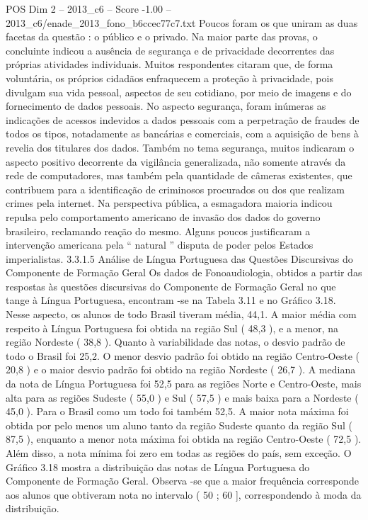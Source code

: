 \begin{textsample}{POS Dim 2 – 2013\_c6 – Score -1.00 – 2013\_c6/enade\_2013\_fono\_b6ccec77c7.txt}
Poucos foram os que uniram as duas facetas da questão : o público e o privado.
Na maior parte das provas, o concluinte indicou a ausência de segurança e de privacidade decorrentes das próprias atividades individuais.
Muitos respondentes citaram que, de forma voluntária, os próprios cidadãos enfraquecem a proteção à privacidade, pois divulgam sua vida pessoal, aspectos de seu cotidiano, por meio de imagens e do fornecimento de dados pessoais.
No aspecto segurança, foram inúmeras as indicações de acessos indevidos a dados pessoais com a perpetração de fraudes de todos os tipos, notadamente as bancárias e comerciais, com a aquisição de bens à revelia dos titulares dos dados.
Também no tema segurança, muitos indicaram o aspecto positivo decorrente da vigilância generalizada, não somente através da rede de computadores, mas também pela quantidade de câmeras existentes, que contribuem para a identificação de criminosos procurados ou dos que realizam crimes pela internet.
Na perspectiva pública, a esmagadora maioria indicou repulsa pelo comportamento americano de invasão dos dados do governo brasileiro, reclamando reação do mesmo.
Alguns poucos justificaram a intervenção americana pela “ natural ” disputa de poder pelos Estados imperialistas. 3.3.1.5 Análise de Língua Portuguesa das Questões Discursivas do Componente de Formação Geral Os dados de Fonoaudiologia, obtidos a partir das respostas às questões discursivas do Componente de Formação Geral no que tange à Língua Portuguesa, encontram -se na Tabela 3.11 e no Gráfico 3.18.
Nesse aspecto, os alunos de todo Brasil tiveram média, 44,1.
A maior média com respeito à Língua Portuguesa foi obtida na região Sul ( 48,3 ), e a menor, na região Nordeste ( 38,8 ).
Quanto à variabilidade das notas, o desvio padrão de todo o Brasil foi 25,2.
O menor desvio padrão foi obtido na região Centro-Oeste ( 20,8 ) e o maior desvio padrão foi obtido na região Nordeste ( 26,7 ).
A mediana da nota de Língua Portuguesa foi 52,5 para as regiões Norte e Centro-Oeste, mais alta para as regiões Sudeste ( 55,0 ) e Sul ( 57,5 ) e mais baixa para a Nordeste ( 45,0 ).
Para o Brasil como um todo foi também 52,5.
A maior nota máxima foi obtida por pelo menos um aluno tanto da região Sudeste quanto da região Sul ( 87,5 ), enquanto a menor nota máxima foi obtida na região Centro-Oeste ( 72,5 ).
Além disso, a nota mínima foi zero em todas as regiões do país, sem exceção.
O Gráfico 3.18 mostra a distribuição das notas de Língua Portuguesa do Componente de Formação Geral.
Observa -se que a maior frequência corresponde aos alunos que obtiveram nota no intervalo ( 50 ; 60 ], correspondendo à moda da distribuição.

\end{textsample}
